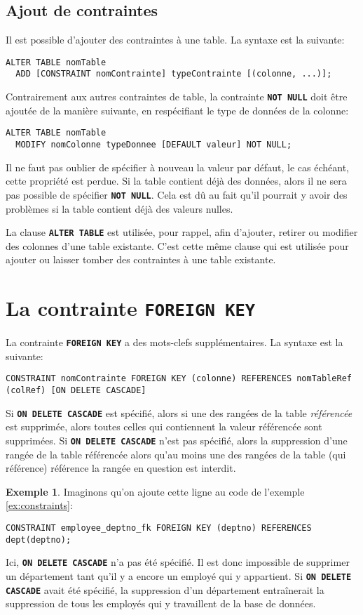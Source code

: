 \documentclass[a4paper, 12pt]{report}
\newcommand{\textSQL}[1]{\texttt{\textbf{#1}}}
\theoremstyle{definition} \newtheorem{ex}{Exemple}
\begin{document}
\subsection{Ajout de contraintes}
Il est possible d'ajouter des contraintes à une table. La syntaxe est la suivante:
\begin{lstlisting}[frame=single]
ALTER TABLE nomTable
  ADD [CONSTRAINT nomContrainte] typeContrainte [(colonne, ...)];
\end{lstlisting}
Contrairement aux autres contraintes de table, la contrainte \textSQL{NOT NULL} doit être ajoutée de la manière suivante, en respécifiant le type de données de la colonne:
\begin{lstlisting}[frame=single]
ALTER TABLE nomTable
  MODIFY nomColonne typeDonnee [DEFAULT valeur] NOT NULL;
\end{lstlisting}
Il ne faut pas oublier de spécifier à nouveau la valeur par défaut, le cas échéant, cette propriété est perdue. Si la table contient déjà des données, alors il ne sera pas possible de spécifier \textSQL{NOT NULL}. Cela est dû au fait qu'il pourrait y avoir des problèmes si la table contient déjà des valeurs nulles.

La clause \textSQL{ALTER TABLE} est utilisée, pour rappel, afin d'ajouter, retirer ou modifier des colonnes d'une table existante. C'est cette même clause qui est utilisée pour ajouter ou laisser tomber des contraintes à une table existante.
\section{La contrainte \textSQL{FOREIGN KEY}}
La contrainte \textSQL{FOREIGN KEY} a des mots-clefs supplémentaires. La syntaxe est la suivante:
\begin{lstlisting}[frame=single]
CONSTRAINT nomContrainte FOREIGN KEY (colonne) REFERENCES nomTableRef (colRef) [ON DELETE CASCADE]
\end{lstlisting}

Si \textSQL{ON DELETE CASCADE} est spécifié, alors si une des rangées de la table \emph{référencée} est supprimée, alors toutes celles qui contiennent la valeur référencée sont supprimées. Si \textSQL{ON DELETE CASCADE} n'est pas spécifié, alors la suppression d'une rangée de la table référencée alors qu'au moins une des rangées de la table (qui référence) référence la rangée en question est interdit.

\begin{ex}
Imaginons qu'on ajoute cette ligne au code de l'exemple \ref{ex:constraints}:
\begin{lstlisting}[frame=single]
CONSTRAINT employee_deptno_fk FOREIGN KEY (deptno) REFERENCES dept(deptno);
\end{lstlisting}

Ici, \textSQL{ON DELETE CASCADE} n'a pas été spécifié. Il est donc impossible de supprimer un département tant qu'il y a encore un employé qui y appartient. Si \textSQL{ON DELETE CASCADE} avait été spécifié, la suppression d'un département entraînerait la suppression de tous les employés qui y travaillent de la base de données.
\end{ex}
\end{document}
